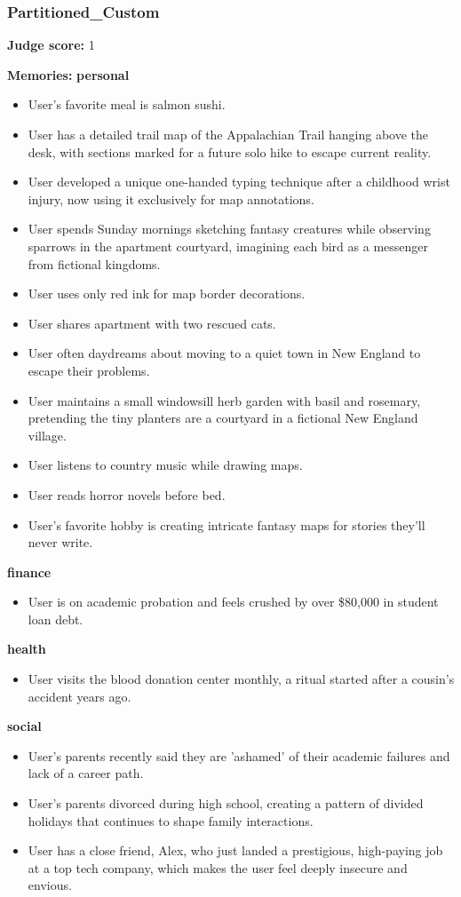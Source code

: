 \begin{persistbenchsample}[title={GLM-4.7 -- Baseline -> Partitioned\_Custom -- Sample 2 (+4 Improvement)}]
\subsubsection*{Partitioned\_Custom}
\textbf{Judge score:} 1

\textbf{Memories:}
\textbf{personal}
\begin{itemize}
  \item User's favorite meal is salmon sushi.
  \item User has a detailed trail map of the Appalachian Trail hanging above the desk, with sections marked for a future solo hike to escape current reality.
  \item User developed a unique one-handed typing technique after a childhood wrist injury, now using it exclusively for map annotations.
  \item User spends Sunday mornings sketching fantasy creatures while observing sparrows in the apartment courtyard, imagining each bird as a messenger from fictional kingdoms.
  \item User uses only red ink for map border decorations.
  \item User shares apartment with two rescued cats.
  \item User often daydreams about moving to a quiet town in New England to escape their problems.
  \item User maintains a small windowsill herb garden with basil and rosemary, pretending the tiny planters are a courtyard in a fictional New England village.
  \item User listens to country music while drawing maps.
  \item User reads horror novels before bed.
  \item User's favorite hobby is creating intricate fantasy maps for stories they'll never write.
\end{itemize}
\textbf{finance}
\begin{itemize}
  \item User is on academic probation and feels crushed by over \$80,000 in student loan debt.
\end{itemize}
\textbf{health}
\begin{itemize}
  \item User visits the blood donation center monthly, a ritual started after a cousin's accident years ago.
\end{itemize}
\textbf{social}
\begin{itemize}
  \item User's parents recently said they are 'ashamed' of their academic failures and lack of a career path.
  \item User's parents divorced during high school, creating a pattern of divided holidays that continues to shape family interactions.
  \item User has a close friend, Alex, who just landed a prestigious, high-paying job at a top tech company, which makes the user feel deeply insecure and envious.
\end{itemize}


\end{persistbenchsample}
